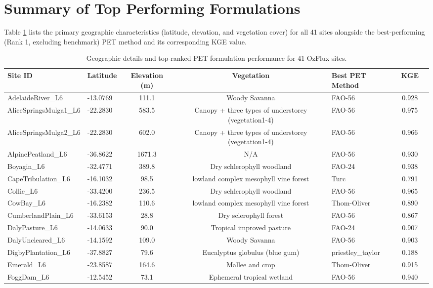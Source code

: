 \documentclass[11pt,a4paper]{article}
\begin{document}
\section{Summary of Top Performing Formulations}
Table \ref{tab:overall_summary} lists the primary geographic characteristics (latitude, elevation, and vegetation cover) for all 41 sites alongside the best-performing (Rank 1, excluding benchmark) PET method and its corresponding KGE value.
\begin{longtable}{llccp{2.5in}cc}
\caption{Geographic details and top-ranked PET formulation performance for 41 OzFlux sites.} \label{tab:overall_summary} \\
\toprule
Site ID & Latitude & Elevation (m) & Vegetation & Best PET Method & KGE \\
\midrule
\endhead
\bottomrule
\endfoot
AdelaideRiver\_L6 & -13.0769 & 111.1 & Woody Savanna & FAO-56 & 0.928 \\
AliceSpringsMulga1\_L6 & -22.2830 & 583.5 & Canopy + three types of understorey (vegetation1-4) & FAO-56 & 0.975 \\
AliceSpringsMulga2\_L6 & -22.2830 & 602.0 & Canopy + three types of understorey (vegetation1-4) & FAO-56 & 0.966 \\
AlpinePeatland\_L6 & -36.8622 & 1671.3 & N/A & FAO-56 & 0.930 \\
Boyagin\_L6 & -32.4771 & 389.8 & Dry schlerophyll woodland & FAO-24 & 0.938 \\
CapeTribulation\_L6 & -16.1032 & 98.5 & lowland complex mesophyll vine forest & Turc & 0.791 \\
Collie\_L6 & -33.4200 & 236.5 & Dry schlerophyll woodland & FAO-56 & 0.965 \\
CowBay\_L6 & -16.2382 & 110.6 & lowland complex mesophyll vine forest & Thom-Oliver & 0.890 \\
CumberlandPlain\_L6 & -33.6153 & 28.8 & Dry sclerophyll forest & FAO-56 & 0.867 \\
DalyPasture\_L6 & -14.0633 & 90.0 & Tropical improved pasture & FAO-24 & 0.907 \\
DalyUncleared\_L6 & -14.1592 & 109.0 & Woody Savanna & FAO-56 & 0.903 \\
DigbyPlantation\_L6 & -37.8827 & 79.6 & Eucalyptus globulus (blue gum) & priestley\_taylor & 0.188 \\
Emerald\_L6 & -23.8587 & 164.6 & Mallee and crop & Thom-Oliver & 0.915 \\
FoggDam\_L6 & -12.5452 & 73.1 & Ephemeral tropical wetland & FAO-56 & 0.940 \\

\end{longtable}
\end{document}
